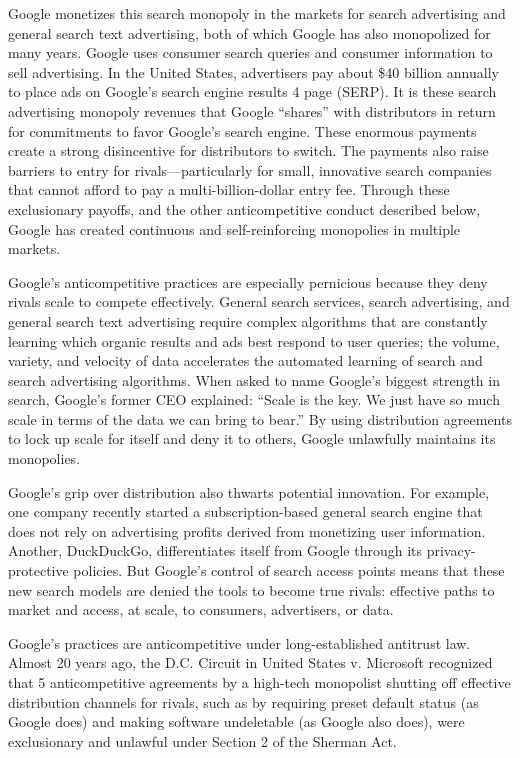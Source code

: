 \documentclass[11pt,b5paper]{scrartcl}
\begin{document}

Google monetizes this search monopoly in the markets for search advertising and
general search text advertising, both of which Google has also monopolized for many years.
Google uses consumer search queries and consumer information to sell advertising. In the United
States, advertisers pay about \$40 billion annually to place ads on Google’s search engine results
4
page (SERP). It is these search advertising monopoly revenues that Google “shares” with
distributors in return for commitments to favor Google’s search engine. These enormous
payments create a strong disincentive for distributors to switch. The payments also raise barriers
to entry for rivals—particularly for small, innovative search companies that cannot afford to pay
a multi-billion-dollar entry fee. Through these exclusionary payoffs, and the other
anticompetitive conduct described below, Google has created continuous and self-reinforcing
monopolies in multiple markets.


Google’s anticompetitive practices are especially pernicious because they deny
rivals scale to compete effectively. General search services, search advertising, and general
search text advertising require complex algorithms that are constantly learning which organic
results and ads best respond to user queries; the volume, variety, and velocity of data accelerates
the automated learning of search and search advertising algorithms. When asked to name
Google’s biggest strength in search, Google’s former CEO explained: “Scale is the key. We just
have so much scale in terms of the data we can bring to bear.” By using distribution agreements
to lock up scale for itself and deny it to others, Google unlawfully maintains its monopolies.


Google’s grip over distribution also thwarts potential innovation. For example,
one company recently started a subscription-based general search engine that does not rely on
advertising profits derived from monetizing user information. Another, DuckDuckGo,
differentiates itself from Google through its privacy-protective policies. But Google’s control of
search access points means that these new search models are denied the tools to become true
rivals: effective paths to market and access, at scale, to consumers, advertisers, or data.


Google’s practices are anticompetitive under long-established antitrust law.
Almost 20 years ago, the D.C. Circuit in United States v. Microsoft recognized that
5
anticompetitive agreements by a high-tech monopolist shutting off effective distribution channels
for rivals, such as by requiring preset default status (as Google does) and making software
undeletable (as Google also does), were exclusionary and unlawful under Section 2 of the
Sherman Act.
\end{document}

